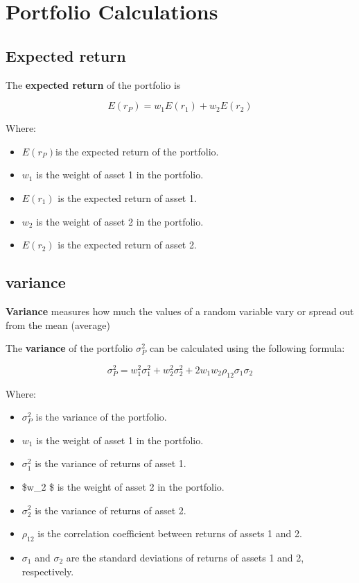 \documentclass[
]{book}
\providecommand{\tightlist}{%
  \setlength{\itemsep}{0pt}\setlength{\parskip}{0pt}}
\begin{document}
\hypertarget{portfolio-calculations}{%
\section{Portfolio Calculations}\label{portfolio-calculations}}

\hypertarget{expected-return-1}{%
\subsection{Expected return}\label{expected-return-1}}

The \textbf{expected return} of the portfolio is

\[ E(r_P) = w_1 E(r_1) + w_2 E(r_2) \]

Where:

\begin{itemize}
\tightlist
\item
  \(E(r_P)\)is the expected return of the portfolio.
\item
  \(w_1\) is the weight of asset 1 in the portfolio.
\item
  \(E(r_1)\) is the expected return of asset 1.
\item
  \(w_2\) is the weight of asset 2 in the portfolio.
\item
  \(E(r_2)\) is the expected return of asset 2.
\end{itemize}

\hypertarget{variance}{%
\subsection{variance}\label{variance}}

\textbf{Variance} measures how much the values of a random variable vary or spread out from the mean (average)

The \textbf{variance} of the portfolio \(\sigma_P^2\) can be calculated using the following formula:

\[ \sigma_P^2 = w_1^2 \sigma_1^2 + w_2^2 \sigma_2^2 + 2w_1 w_2 \rho_{12} \sigma_1 \sigma_2 \]

Where:

\begin{itemize}
\tightlist
\item
  \(\sigma_P^2\) is the variance of the portfolio.
\item
  \(w_1\) is the weight of asset 1 in the portfolio.
\item
  \(\sigma_1^2\) is the variance of returns of asset 1.
\item
  \$w\_2 \$ is the weight of asset 2 in the portfolio.
\item
  \(\sigma_2^2\) is the variance of returns of asset 2.
\item
  \(\rho_{12}\) is the correlation coefficient between returns of assets 1 and 2.
\item
  \(\sigma_1\) and \(\sigma_2\) are the standard deviations of returns of assets 1 and 2, respectively.
\end{itemize}
\end{document}
